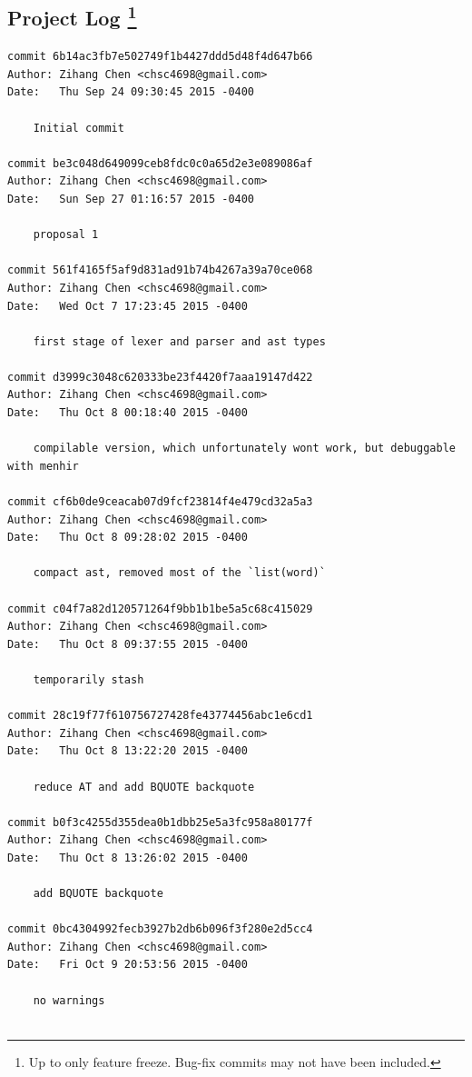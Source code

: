 \documentclass{report}
\begin{document}
\begin{appendices}
\chapter[Project Log]{Project Log \footnote{Up to only feature freeze. Bug-fix commits may not have been included.}}
\label{project-log}

\begin{verbatim}
commit 6b14ac3fb7e502749f1b4427ddd5d48f4d647b66
Author: Zihang Chen <chsc4698@gmail.com>
Date:   Thu Sep 24 09:30:45 2015 -0400

    Initial commit

commit be3c048d649099ceb8fdc0c0a65d2e3e089086af
Author: Zihang Chen <chsc4698@gmail.com>
Date:   Sun Sep 27 01:16:57 2015 -0400

    proposal 1

commit 561f4165f5af9d831ad91b74b4267a39a70ce068
Author: Zihang Chen <chsc4698@gmail.com>
Date:   Wed Oct 7 17:23:45 2015 -0400

    first stage of lexer and parser and ast types

commit d3999c3048c620333be23f4420f7aaa19147d422
Author: Zihang Chen <chsc4698@gmail.com>
Date:   Thu Oct 8 00:18:40 2015 -0400

    compilable version, which unfortunately wont work, but debuggable with menhir

commit cf6b0de9ceacab07d9fcf23814f4e479cd32a5a3
Author: Zihang Chen <chsc4698@gmail.com>
Date:   Thu Oct 8 09:28:02 2015 -0400

    compact ast, removed most of the `list(word)`

commit c04f7a82d120571264f9bb1b1be5a5c68c415029
Author: Zihang Chen <chsc4698@gmail.com>
Date:   Thu Oct 8 09:37:55 2015 -0400

    temporarily stash

commit 28c19f77f610756727428fe43774456abc1e6cd1
Author: Zihang Chen <chsc4698@gmail.com>
Date:   Thu Oct 8 13:22:20 2015 -0400

    reduce AT and add BQUOTE backquote

commit b0f3c4255d355dea0b1dbb25e5a3fc958a80177f
Author: Zihang Chen <chsc4698@gmail.com>
Date:   Thu Oct 8 13:26:02 2015 -0400

    add BQUOTE backquote

commit 0bc4304992fecb3927b2db6b096f3f280e2d5cc4
Author: Zihang Chen <chsc4698@gmail.com>
Date:   Fri Oct 9 20:53:56 2015 -0400

    no warnings


\end{verbatim}
\end{appendices}
\end{document}
